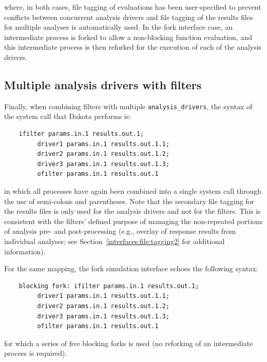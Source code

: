 where, in both cases, file tagging of evaluations has been
user-specified to prevent conflicts between concurrent analysis
drivers and file tagging of the results files for multiple analyses is
automatically used. In the fork interface case, an intermediate
process is forked to allow a non-blocking function evaluation, and
this intermediate process is then reforked for the execution of each
of the analysis drivers.

\subsection{Multiple analysis drivers with filters}\label{interfaces:components:multiple2}

Finally, when combining filters with multiple
\texttt{analysis\_drivers}, the syntax of the system call that Dakota
performs is:
\begin{small}
\begin{verbatim}
    ifilter params.in.1 results.out.1;
         driver1 params.in.1 results.out.1.1;
         driver2 params.in.1 results.out.1.2;
         driver3 params.in.1 results.out.1.3;
         ofilter params.in.1 results.out.1
\end{verbatim}
\end{small}

in which all processes have again been combined into a single system
call through the use of semi-colons and parentheses. Note that the
secondary file tagging for the results files is only used for the
analysis drivers and not for the filters. This is consistent with the
filters' defined purpose of managing the non-repeated portions of
analysis pre- and post-processing (e.g., overlay of response results
from individual analyses; see Section~\ref{interfaces:file:tagging2}
for additional information).

For the same mapping, the fork simulation interface echoes the
following syntax:
\begin{small}
\begin{verbatim}
    blocking fork: ifilter params.in.1 results.out.1;
         driver1 params.in.1 results.out.1.1;
         driver2 params.in.1 results.out.1.2;
         driver3 params.in.1 results.out.1.3;
         ofilter params.in.1 results.out.1
\end{verbatim}
\end{small}

for which a series of five blocking forks is used (no reforking of an
intermediate process is required).

